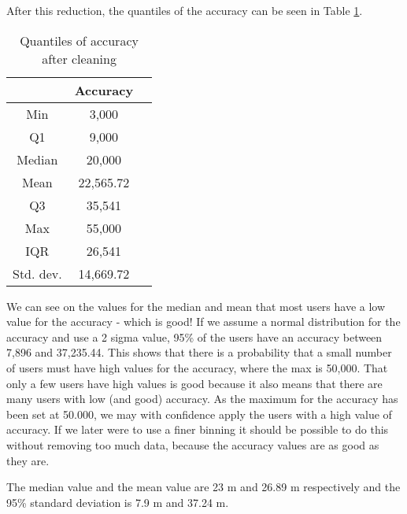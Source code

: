After this reduction, the quantiles of the accuracy can be seen in Table \ref{tab:acc_quantiles}. 
 \begin{table}[htbp]
        \centering
        \small
        \setlength\tabcolsep{2pt}
        \begin{tabular}{|c|c|c|}
            \hline
                         & Accuracy      \\[0pt]
            \hline
                 Min     &  3,000       \\
            \hline
                 Q1      &  9,000   \\
            \hline
                 Median  &  20,000    \\
            \hline
                 Mean    &  22,565.72    \\
            \hline
                 Q3      &  35,541      \\
            \hline
                 Max &  55,000   \\
            \hline
                 IQR     &   26,541     \\
            \hline
                Std. dev.  &  14,669.72   \\
            \hline
        \end{tabular}
        \caption{Quantiles of accuracy after cleaning} %
        \label{tab:acc_quantiles}
\end{table}

We can see on the values for the median and mean that most users have a low value for the accuracy - which is good! If we assume a normal distribution for the accuracy and use a 2 sigma value, 95\% of the users have an accuracy between 7,896 and 37,235.44. This shows that there is a probability that a small number of users must have high values for the accuracy, where the max is 50,000. That only a few users have high values is good because it also means that there are many users with low (and good) accuracy. As the maximum for the accuracy has been set at 50.000, we may with confidence apply the users with a high value of accuracy. If we later were to use a finer binning it should be possible to do this without removing too much data, because the accuracy values are as good as they are.   

The median value and the mean value are 23 m and 26.89 m respectively and the 95\% standard deviation is 7.9 m and 37.24 m. 


